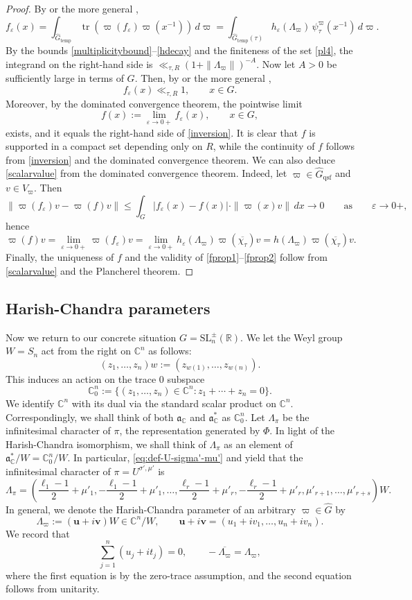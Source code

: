 \documentclass[11pt,oneside]{amsart}
\numberwithin{equation}{section}
\theoremstyle{remark}
\theoremstyle{plain}
\DeclareMathOperator{\tr}{tr}
\newcommand\SL{\mathrm{SL}}
\newcommand\RR{\mathbb{R}}
\newcommand\CC{\mathbb{C}}
\newcommand\mfa{\mathfrak{a}}
\newcommand{\bu}{\mathbf{u}}
\newcommand{\bv}{\mathbf{v}}
\newcommand\ov{\overline}
\newcommand\eps{\varepsilon}
\renewcommand\leq{\leqslant}
\newcommand\Gtemp{\widehat{G}_\mathrm{temp}}
\newcommand\Gqsf{\widehat{G}_\mathrm{qsf}}
\begin{document}
\begin{proof}
By \cite[Th.~27.3]{HC3} or the more general \cite[Th.~6.27]{HW},
\[f_\eps(x)=\int_{\Gtemp} \tr(\varpi(f_\eps)\varpi(x^{-1}))\,d\varpi=\int_{\Gtemp(\tau)} h_\eps(\Lambda_\varpi)\,\psi_\tau^\varpi(x^{-1})\,d\varpi.\]
By the bounds \eqref{multiplicitybound}--\eqref{hdecay} and the finiteness of the set \eqref{pl4}, the integrand on the right-hand side is $\ll_{\tau,R}(1+\|\Lambda_\varpi\|)^{-A}$. Now let $A>0$ be sufficiently large in terms of $G$. Then, by \cite[Th.~25.1]{HC3} or the more general \cite[Lem.~3.3]{HW2},
\[f_\eps(x)\ll_{\tau,R}1,\qquad x\in G.\]
Moreover, by the dominated convergence theorem, the pointwise limit
\[f(x):=\lim_{\eps\to 0+}f_\eps(x),\qquad x\in G,\]
exists, and it equals the right-hand side of \eqref{inversion}. It is clear that $f$ is supported in a compact set depending only on $R$, while the continuity of $f$ follows from \eqref{inversion} and the dominated convergence theorem. We can also deduce \eqref{scalarvalue} from the dominated convergence theorem. Indeed, let $\varpi\in\Gqsf$ and $v\in V_\varpi$. Then
\[\|\varpi(f_\eps)v-\varpi(f)v\|\leq\int_G|f_\eps(x)-f(x)|\cdot\|\varpi(x)v\|\,dx\to 0\qquad\text{as}\qquad\eps\to 0+,\]
hence
\[\varpi(f)v=\lim_{\eps\to 0+}\varpi(f_\eps)v=\lim_{\eps\to 0+}h_\eps(\Lambda_\varpi)\varpi(\ov{\chi_\tau})v=h(\Lambda_\varpi)\varpi(\ov{\chi_\tau})v.\]
Finally, the uniqueness of $f$ and the validity of \eqref{fprop1}--\eqref{fprop2} follow from \eqref{scalarvalue} and the Plancherel theorem.
\end{proof}

\subsection{Harish-Chandra parameters}\label{sec62}
Now we return to our concrete situation $G=\SL_n^{\pm}(\RR)$. We let the Weyl group $W=S_n$ act from the right on $\CC^n$ as follows:
\[(z_1,\dotsc,z_n)w:=(z_{w(1)},\dotsc,z_{w(n)}).\]
This induces an action on the trace $0$ subspace
\[
\CC^n_0:=\{(z_1,\dotsc,z_n)\in\CC^n:z_1+\dotsb+z_n=0\}.
\]
We identify $\CC^n$ with its dual via the standard scalar product on $\CC^n$. Correspondingly, we shall think of both $\mfa_{\CC}$ and $\mfa_{\CC}^*$ as $\CC^n_0$. Let $\Lambda_{\pi}$ be the infinitesimal character of $\pi$, the representation generated by $\Phi$. In light of the Harish-Chandra isomorphism, we shall think of $\Lambda_{\pi}$ as an element of $\mfa_{\CC}^*/W=\CC^n_0/W$. In particular, \eqref{eq:def-U-sigma'-mu'} and \cite[Prop.~11.43]{KV} yield that the infinitesimal character of $\pi=U^{\sigma',\mu'}$ is
\begin{equation}\label{picharacter}
\Lambda_{\pi} = \left(\frac{\ell_1-1}{2}+\mu'_1,-\frac{\ell_1-1}{2}+\mu'_1,\dotsc,\frac{\ell_r-1}{2}+\mu'_r,-\frac{\ell_r-1}{2}+\mu'_r,\mu'_{r+1},\dotsc,\mu'_{r+s}\right)W.
\end{equation}
In general, we denote the Harish-Chandra parameter of an arbitrary $\varpi\in\widehat{G}$ by
\[
\Lambda_{\varpi}:=(\bu+i\bv)W\in\CC^n/W,\qquad \bu+i\bv=(u_1+iv_1,\dotsc,u_n+iv_n).
\]
We record that
\[
\sum_{j=1}^n (u_j+it_j)=0,\qquad -\ov{\Lambda_{\varpi}}=\Lambda_{\varpi},
\]
where the first equation is by the zero-trace assumption, and the second equation follows from unitarity.
\end{document}
